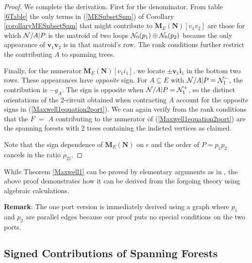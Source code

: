 \documentclass[12pt]{article}
\theoremstyle{definition}
\newcommand{\Remark}{\textbf{Remark}}
\newcommand{\ext}[1]{\ensuremath{\mathbf{#1}}}
\begin{document}
\begin{proof}
We complete the derivation.
First for the denominator.
From table \ref{6Table} the only terms in 
(\ref{MESubsetSum}) of Corollary \ref{corollaryMESubsetSum} 
that might contribute to 
$\ext{M}_E(\ext{N})[v_1v_2]$ are those for which $\mathcal{N}/A|P$ is the matroid
of two loops $\mathcal{N}_0(p_1)\oplus \mathcal{N}_0(p_2)$ because the only appearance
of $\ext{v}_1\ext{v}_2$ is in that matroid's row.  The rank conditions further
restrict the contributing $A$ to spanning trees.

Finally, for the numerator $\ext{M}_E(\ext{N})[v_1i_1]$, we locate 
$\pm \ext{v}_1\ext{i}_1$ in the bottom two rows.
These appearances have \textit{opposite} sign.
For $A\subseteq E$ with $\mathcal{N}/A|P=\mathcal{N}_1^-$, the contribution
is $-g_A$.  
The sign is opposite
when $\mathcal{N}/A|P=\mathcal{N}_1^+$, so the distinct orientations of the 2-circuit
obtained when contracting $A$ account for the opposite signs
in (\ref{Maxwell1equation2port}).  We can again verify from the rank
conditions that the $F$ $=$ $A$ contributing to the numerator of 
(\ref{Maxwell1equation2port}) are the spanning forests with 2 trees
containing the indicted vertices as claimed.

Note that the sign dependence of $\ext{M}_E(\ext{N})$ on $\epsilon$ and
the order of $P=p_1p_2$ cancels in the ratio $\rho_{21}$.
\end{proof}

While Theorem \ref{Maxwell1} can be proved by elementary arguments as in
\cite{ChensBook}, the above proof demonstrates how it can be derived
from the forgoing theory using algebraic calculations.

\Remark: The one port version 
is immediately derived using a graph where 
$p_1$ and $p_2$ are parallel edges because our proof puts no
special conditions on the two ports.

\subsection{Signed Contributions of Spanning Forests}
\end{document}

